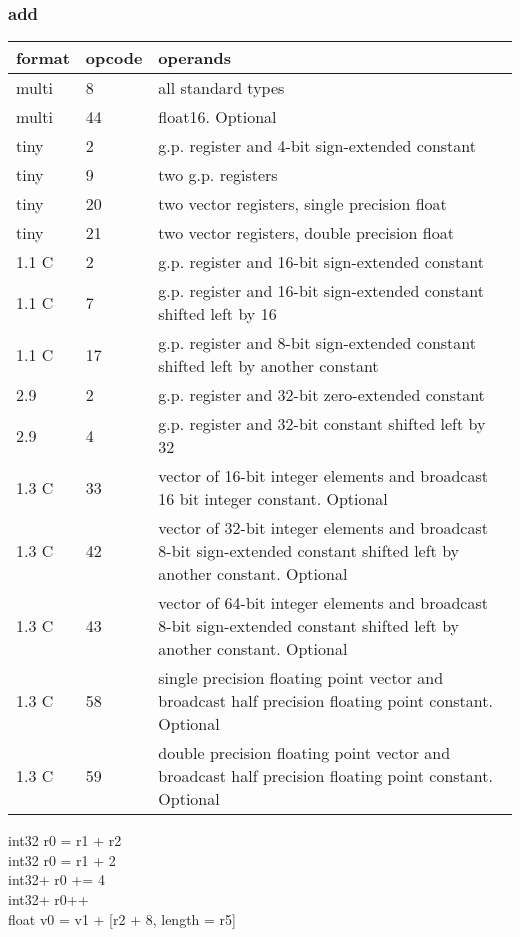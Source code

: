 \documentclass[forwardcom.tex]{subfiles}
\begin{document}
\subsubsection{add}
\label{table:addInstruction}
\begin{tabular}{|p{12mm}|p{12mm}|p{110mm}|}
\hline
\bfseries format & \bfseries opcode & \bfseries operands \\ \hline
multi &  8 & all standard types \\ \hline
multi & 44 & float16. Optional \\ \hline
tiny  &  2 & g.p. register and 4-bit sign-extended constant \\ \hline
tiny  &  9 & two g.p. registers \\ \hline
tiny  & 20 & two vector registers, single precision float \\ \hline
tiny  & 21 & two vector registers, double precision float \\ \hline
1.1 C &  2 & g.p. register and 16-bit sign-extended constant \\ \hline
1.1 C &  7 & g.p. register and 16-bit sign-extended constant shifted left by 16 \\ \hline
1.1 C & 17 & g.p. register and 8-bit sign-extended constant shifted left by another constant \\ \hline
2.9   &  2 & g.p. register and 32-bit zero-extended constant \\ \hline
2.9   &  4 & g.p. register and 32-bit constant shifted left by 32 \\ \hline
1.3 C & 33 & vector of 16-bit integer elements and broadcast 16 bit integer constant. Optional \\ \hline
1.3 C & 42 & vector of 32-bit integer elements and broadcast 8-bit sign-extended constant shifted left by another constant. Optional \\ \hline
1.3 C & 43 & vector of 64-bit integer elements and broadcast 8-bit sign-extended constant shifted left by another constant. Optional \\ \hline
1.3 C & 58 & single precision floating point vector and broadcast half precision floating point constant. Optional \\ \hline
1.3 C & 59 & double precision floating point vector and broadcast half precision floating point constant. Optional \\ \hline
\end{tabular}
\vspace{2mm}

int32 r0 = r1 + r2 \\
int32 r0 = r1 + 2 \\
int32+ r0 += 4 \\
int32+ r0++ \\
float v0 = v1 + [r2 + 8, length = r5]
\vspace{2mm}
\end{document}

